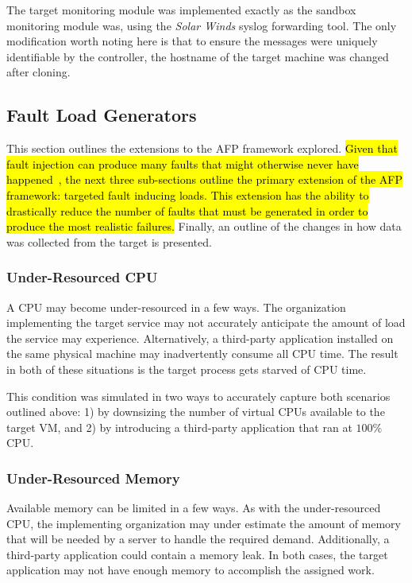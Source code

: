 The target monitoring module was implemented exactly as the sandbox monitoring
module was, using the \emph{Solar Winds} syslog forwarding tool.  The only
modification worth noting here is that to ensure the messages were uniquely
identifiable by the controller, the hostname of the target machine was changed
after cloning.

\setcounter{secnumdepth}{3}

\subsection{Fault Load Generators} \label{sec:extensions}
This section outlines the extensions to the \ac{AFP} framework explored.
\hl{Given that fault injection can produce many faults that might otherwise
never have happened~\citep{kikuchi2014}, the next three sub-sections outline
the primary extension of the \ac{AFP} framework: targeted fault inducing
loads.  This extension has the ability to drastically reduce the number of
faults that must be generated in order to produce the most realistic failures.}
Finally, an outline of the changes in how data was collected from the target is
presented.

\subsubsection{Under-Resourced \ac{CPU}} \label{sec:extUnderResourcedCPU}
A \ac{CPU} may become under-resourced in a few ways.  The organization
implementing the target service may not accurately anticipate the amount of
load the service may experience.  Alternatively, a third-party application
installed on the same physical machine may inadvertently consume all \ac{CPU}
time.  The result in both of these situations is the target process gets
starved of \ac{CPU} time.

This condition was simulated in two ways to accurately capture both scenarios
outlined above:  1) by downsizing the number of virtual \ac{CPU}s available
to the target \ac{VM}, and 2) by introducing a third-party application that
ran at $100\%$ \ac{CPU}.

\subsubsection{Under-Resourced Memory} \label{sec:extUnderResourcedMem}
Available memory can be limited in a few ways.  As with the under-resourced
\ac{CPU}, the implementing organization may under estimate the amount of memory
that will be needed by a server to handle the required demand.  Additionally, a
third-party application could contain a memory leak.  In both cases, the target
application may not have enough memory to accomplish the assigned work.

